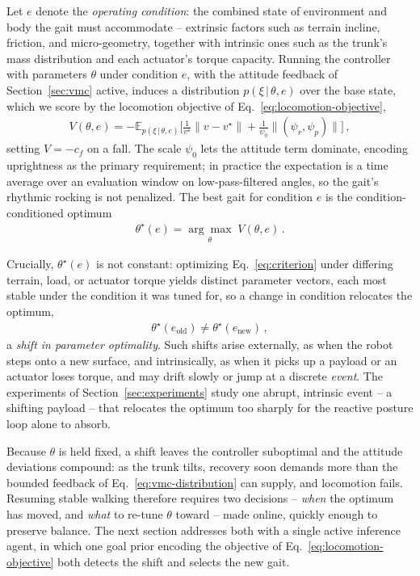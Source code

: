 \documentclass[letterpaper, 10 pt, conference]{ieeeconf}  %
\newcommand\given[1][]{\,#1\vert\,}
\begin{document}
Let $e$ denote the \emph{operating condition}: the combined state of environment and body the gait must accommodate -- extrinsic factors such as terrain incline, friction, and micro-geometry, together with intrinsic ones such as the trunk's mass distribution and each actuator's torque capacity.
Running the controller with parameters $\theta$ under condition $e$, with the attitude feedback of Section~\ref{sec:vmc} active, induces a distribution $p(\xi \given \theta, e)$ over the base state, which we score by the locomotion objective of Eq.~\ref{eq:locomotion-objective},
\begin{align}
    V(\theta, e) = - \mathbb{E}_{p(\xi \given \theta, e)} \Big[ \frac{1}{v^\star} \big\lVert v - v^\star \big\rVert + \frac{1}{\psi_0} \big\lVert (\psi_r, \psi_p) \big\rVert \Big] \,,
    \label{eq:criterion}
\end{align}
setting $V = -c_f$ on a fall.
The scale $\psi_0$ lets the attitude term dominate, encoding uprightness as the primary requirement; in practice the expectation is a time average over an evaluation window on low-pass-filtered angles, so the gait's rhythmic rocking is not penalized.
The best gait for condition $e$ is the condition-conditioned optimum
\begin{align}
    \theta^{\star}(e) = \underset{\theta}{\arg\max}\; V(\theta, e) \,.
    \label{eq:terrain-optimum}
\end{align}

Crucially, $\theta^{\star}(e)$ is not constant: optimizing Eq.~\ref{eq:criterion} under differing terrain, load, or actuator torque yields distinct parameter vectors, each most stable under the condition it was tuned for, so a change in condition relocates the optimum,
\begin{align}
    \theta^{\star}(e_{\text{old}}) \neq \theta^{\star}(e_{\text{new}}) \,,
    \label{eq:optimality-shift}
\end{align}
a \emph{shift in parameter optimality}.
Such shifts arise externally, as when the robot steps onto a new surface, and intrinsically, as when it picks up a payload or an actuator loses torque, and may drift slowly or jump at a discrete \emph{event}.
The experiments of Section~\ref{sec:experiments} study one abrupt, intrinsic event -- a shifting payload -- that relocates the optimum too sharply for the reactive posture loop alone to absorb.

Because $\theta$ is held fixed, a shift leaves the controller suboptimal and the attitude deviations compound: as the trunk tilts, recovery soon demands more than the bounded feedback of Eq.~\ref{eq:vmc-distribution} can supply, and locomotion fails.
Resuming stable walking therefore requires two decisions -- \emph{when} the optimum has moved, and \emph{what} to re-tune $\theta$ toward -- made online, quickly enough to preserve balance.
The next section addresses both with a single active inference agent, in which one goal prior encoding the objective of Eq.~\ref{eq:locomotion-objective} both detects the shift and selects the new gait.
\end{document}
